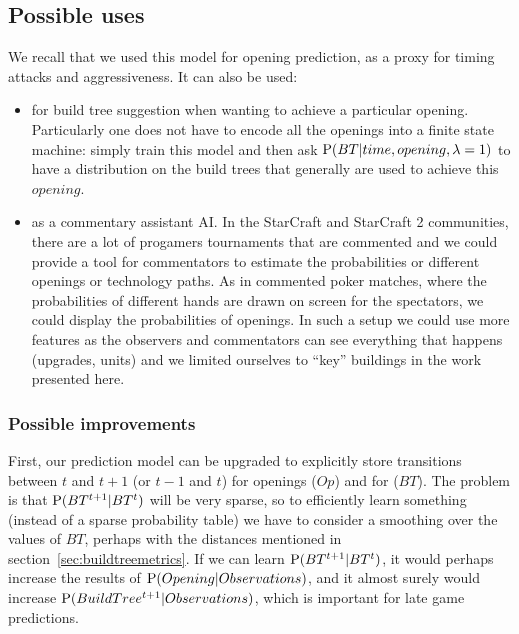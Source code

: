 \subsection{Possible uses}
We recall that we used this model for opening prediction, as a proxy for timing attacks and aggressiveness. It can also be used:
\begin{itemize}
    \item for build tree suggestion when wanting to achieve a particular opening. Particularly one does not have to encode all the openings into a finite state machine: simply train this model and then ask $\mathrm{P}(BT|time,opening,\lambda=1)$ to have a distribution on the build trees that generally are used to achieve this $opening$.
    \item as a commentary assistant AI. In the StarCraft and StarCraft 2 communities, there are a lot of progamers tournaments that are commented and we could provide a tool for commentators to estimate the probabilities or different openings or technology paths. As in commented poker matches, where the probabilities of different hands are drawn on screen for the spectators, we could display the probabilities of openings. In such a setup we could use more features as the observers and commentators can see everything that happens (upgrades, units) and we limited ourselves to ``key'' buildings in the work presented here.
\end{itemize}

\subsubsection{Possible improvements}
\label{sec:openingspossibleimprovements}

First, our prediction model can be upgraded to explicitly store transitions between $t$ and $t+1$ (or $t-1$ and $t$) for openings ($Op$) and for  ($BT$). The problem is that $\mathrm{P}(BT^{t+1}|BT^t)$ will be very sparse, so to efficiently learn something (instead of a sparse probability table) we have to consider a smoothing over the values of $BT$, perhaps with the distances mentioned in section~\ref{sec:buildtreemetrics}. If we can learn $\mathrm{P}(BT^{t+1}|BT^t)$, it would perhaps increase the results of $\mathrm{P}(Opening|Observations)$, and it almost surely would increase $\mathrm{P}(BuildTree^{t+1}|Observations)$, which is important for late game predictions. 

